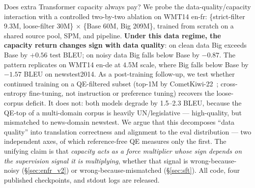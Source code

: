 Does extra Transformer capacity always pay? We probe the data-quality/capacity interaction with a controlled two-by-two ablation on WMT14 en-fr: \{strict-filter 9.3M, loose-filter 30M\} $\times$ \{Base 60M, Big 209M\}, trained from scratch on a shared source pool, SPM, and pipeline. \textbf{Under this data regime, the capacity return changes sign with data quality}: on clean data Big exceeds Base by $+0.56$ test BLEU; on noisy data Big falls below Base by $-0.87$. The pattern replicates on WMT14 en-de at 4.5M scale, where Big falls below Base by $-1.57$ BLEU on newstest2014. As a post-training follow-up, we test whether continued training on a QE-filtered subset (top-1M by CometKiwi-22~\cite{rei2022cometkiwi}; cross-entropy fine-tuning, not instruction or preference tuning) recovers the loose-corpus deficit. It does not: both models degrade by 1.5--2.3 BLEU, because the QE-top of a multi-domain corpus is heavily UN/legislative --- high-quality, but mismatched to news-domain newstest. We argue that this decomposes ``data quality'' into translation correctness and alignment to the eval distribution --- two independent axes, of which reference-free QE measures only the first. The unifying claim is that \emph{capacity acts as a force multiplier whose sign depends on the supervision signal it is multiplying}, whether that signal is wrong-because-noisy (\S\ref{sec:enfr_v2}) or wrong-because-mismatched (\S\ref{sec:sft}). All code, four published checkpoints, and stdout logs are released.
